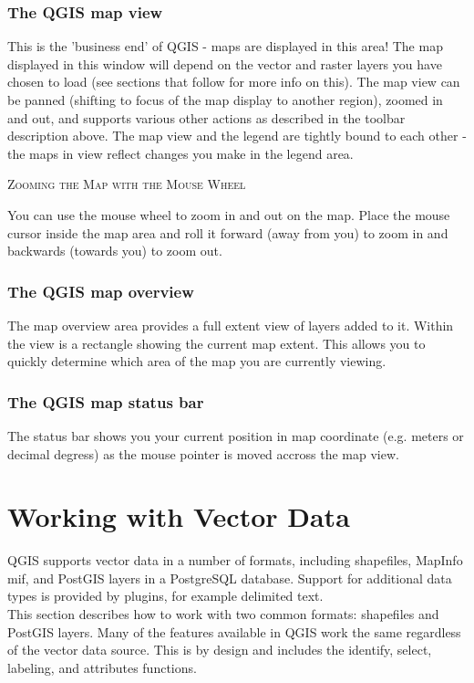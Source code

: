 \documentclass[10pt,english]{article}
\newcommand\qgistip[1]{\raggedright\small{#1}}
\begin{document}
\begin{onehalfspace}
\subsubsection{The QGIS map view}
This is the 'business end' of QGIS - maps are displayed in this area! The map
displayed in this window will depend on the vector and raster layers you have
chosen to load (see sections that follow for more info on this). The map view
can be panned (shifting to focus of the map display to another region), zoomed
in and out, and supports various other actions as described in the toolbar
description above.  The map view and the legend are tightly bound to each
other - the maps in view reflect changes you make in the legend area.  
\begin{Tip}\caption{\textsc{Zooming the Map with the Mouse
Wheel}}
\qgistip{You can use the mouse wheel to zoom in and out on the map. Place the mouse cursor inside the map area and roll it forward (away from you) to zoom in and backwards (towards you) to zoom out.
}
\end{Tip}
\subsubsection{The QGIS map overview}
The map overview area provides a full extent view of layers added to it. Within the view is a rectangle showing the current map extent. This allows you to quickly determine which area of the map you are currently viewing.

\subsubsection{The QGIS map status bar} 
The status bar shows you your current position in map coordinate (e.g. meters
or decimal degress) as the mouse pointer is moved accross the map view.

\section{Working with Vector Data}
QGIS supports vector data in a number of formats, including shapefiles,
MapInfo mif, and PostGIS layers in a PostgreSQL database. Support for
additional data types is provided by plugins, for example delimited
text.\\

This section describes how to work with two common formats:
shapefiles and PostGIS layers. Many of the
features available in QGIS work the same regardless of the vector data source.
This is by design and includes the identify, select, labeling, and attributes
functions.


\end{onehalfspace}
\end{document}
